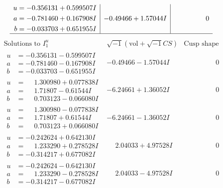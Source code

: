 \documentclass[1p]{elsarticle_modified}
\theoremstyle{definition}
\newcommand{\I}{\sqrt{-1}}
\begin{document}
$$\begin{array}{c|c|c}
\begin{aligned}
u &= -0.356131 + 0.599507 I \\
a &= -0.781460 + 0.167908 I \\
b &= -0.033703 + 0.651955 I\end{aligned}
 & -0.49466 + 1.57044 I & \phantom{-0.000000 } 0\\
 \hline 
 \end{array}$$\newpage$$\begin{array}{c|c|c}  
\text{Solutions to }I^u_{1}& \I (\text{vol} + \sqrt{-1}CS) & \text{Cusp shape}\\
 \hline 
\begin{aligned}
u &= -0.356131 - 0.599507 I \\
a &= -0.781460 - 0.167908 I \\
b &= -0.033703 - 0.651955 I\end{aligned}
 & -0.49466 - 1.57044 I & \phantom{-0.000000 } 0 \\ \hline\begin{aligned}
u &= \phantom{-}1.300980 + 0.077838 I \\
a &= \phantom{-}1.71807 - 0.61544 I \\
b &= \phantom{-}0.703123 - 0.066080 I\end{aligned}
 & -6.24661 + 1.36052 I & \phantom{-0.000000 } 0 \\ \hline\begin{aligned}
u &= \phantom{-}1.300980 - 0.077838 I \\
a &= \phantom{-}1.71807 + 0.61544 I \\
b &= \phantom{-}0.703123 + 0.066080 I\end{aligned}
 & -6.24661 - 1.36052 I & \phantom{-0.000000 } 0 \\ \hline\begin{aligned}
u &= -0.242624 + 0.642130 I \\
a &= \phantom{-}1.233290 + 0.278528 I \\
b &= -0.314217 + 0.677082 I\end{aligned}
 & \phantom{-}2.04033 + 4.97528 I & \phantom{-0.000000 } 0 \\ \hline\begin{aligned}
u &= -0.242624 - 0.642130 I \\
a &= \phantom{-}1.233290 - 0.278528 I \\
b &= -0.314217 - 0.677082 I\end{aligned}
 & \phantom{-}2.04033 - 4.97528 I & \phantom{-0.000000 } 0 \\ \hline\begin{aligned}

\end{aligned}
\end{array}$$
\end{document}
